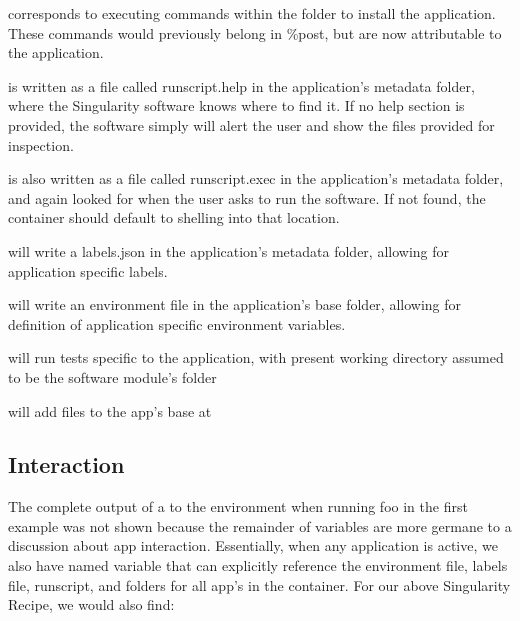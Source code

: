 \documentclass[letterpaper,10pt,english]{sphinxmanual}
\begin{document}
 corresponds to executing commands within the folder to
install the application. These commands would previously belong in
\%post, but are now attributable to the application.

 is written as a file called runscript.help in the
application’s metadata folder, where the Singularity software knows
where to find it. If no help section is provided, the software simply
will alert the user and show the files provided for inspection.

 is also written as a file called runscript.exec in the
application’s metadata folder, and again looked for when the user asks
to run the software. If not found, the container should default to
shelling into that location.

 will write a labels.json in the application’s metadata
folder, allowing for application specific labels.

 will write an environment file in the application’s base
folder, allowing for definition of application specific environment
variables.

 will run tests specific to the application, with present
working directory assumed to be the software module’s folder

 will add files to the app’s base at 


\subsection{Interaction}
\label{\detokenize{reproducible_scif_apps:interaction}}
The complete output of a  to the environment when
running foo in the first example was not shown because the remainder of variables
are more germane to a discussion about app interaction. Essentially, when
any application is active, we also have named variable that can explicitly
reference the environment file, labels file, runscript,  and  folders for
all app’s in the container. For our above Singularity Recipe, we would
also find:
\end{document}
